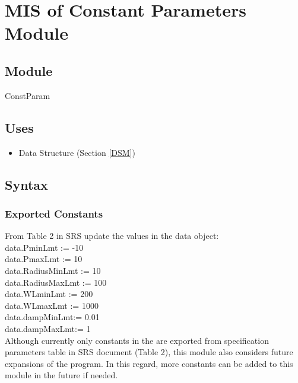 \documentclass[12pt, titlepage]{article}
\begin{document}
\newpage
%
%
%
%
%
\section{MIS of Constant Parameters Module} \label{CPM} 


\subsection{Module}
ConstParam

\subsection{Uses}
\begin{itemize}
	\item Data Structure (Section \ref{DSM})
\end{itemize}

\subsection{Syntax}

\subsubsection{Exported Constants}

From Table 2 in SRS update the values in the data object:\\

data.PminLmt := -10\\

data.PmaxLmt := 10\\

data.RadiusMinLmt := 10\\

data.RadiusMaxLmt := 100\\

data.WLminLmt := 200\\

data.WLmaxLmt := 1000\\

data.dampMinLmt:= 0.01\\

data.dampMaxLmt:= 1\\

Although currently only constants in the \progname{} are exported from specification parameters table in SRS document (Table 2), this module also considers future expansions of the program. In this regard, more constants can be added to this module in the future if needed. 
\end{document}
